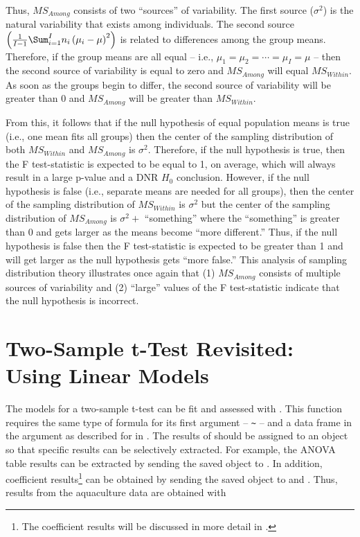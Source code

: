 \documentclass[10pt,openany]{book}\usepackage[]{graphicx}\usepackage[]{color}
\begin{document}
Thus, $MS_{Among}$ consists of two ``sources'' of variability.  The first source ($\sigma^{2}$) is the natural variability that exists among individuals.  The second source $\left(\frac{1}{I-1}\Sum_{i=1}^{I}n_{i}\left(\mu_{i}-\mu\right)^{2}\right)$ is related to differences among the group means.  Therefore, if the group means are all equal -- i.e., $\mu_{1}=\mu_{2}=\cdots=\mu_{I}=\mu$ -- then the second source of variability is equal to zero and $MS_{Among}$ will equal $MS_{Within}$.  As soon as the groups begin to differ, the second source of variability will be greater than 0 and $MS_{Among}$ will be greater than $MS_{Within}$.

From this, it follows that if the null hypothesis of equal population means is true (i.e., one mean fits all groups) then the center of the sampling distribution of both $MS_{Within}$ and $MS_{Among}$ is $\sigma^{2}$.  Therefore, if the null hypothesis is true, then the F test-statistic is expected to be equal to 1, on average, which will always result in a large p-value and a DNR $H_{0}$ conclusion.  However, if the null hypothesis is false (i.e., separate means are needed for all groups), then the center of the sampling distribution of $MS_{Within}$ is $\sigma^{2}$ but the center of the sampling distribution of $MS_{Among}$ is $\sigma^{2} +$ ``something'' where the ``something'' is greater than 0 and gets larger as the means become ``more different.''  Thus, if the null hypothesis is false then the F test-statistic is expected to be greater than 1 and will get larger as the null hypothesis gets ``more false.''  This analysis of sampling distribution theory illustrates once again that (1) $MS_{Among}$ consists of multiple sources of variability and (2) ``large'' values of the F test-statistic indicate that the null hypothesis is incorrect.


\section{Two-Sample t-Test Revisited: Using Linear Models}
The models for a two-sample t-test can be fit and assessed with .  This function requires the same type of formula for its first argument -- \verb"~" -- and a data frame in the  argument as described for  in .  The results of  should be assigned to an object so that specific results can be selectively extracted.  For example, the ANOVA table results can be extracted by sending the saved  object to .  In addition, coefficient results\footnote{The coefficient results will be discussed in more detail in .} can be obtained by sending the saved  object to  and .  Thus, results from the aquaculture data are obtained with
\end{document}
